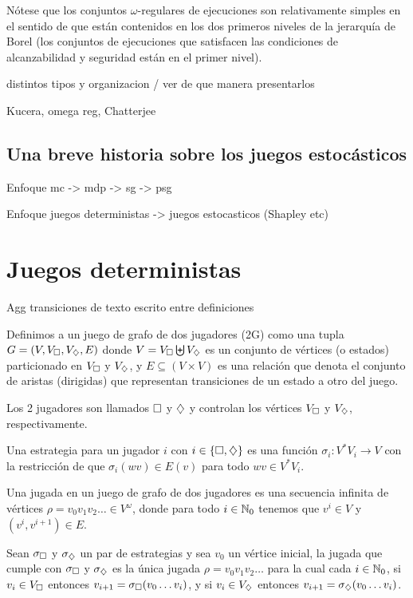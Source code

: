 Nótese que los conjuntos \(\omega\)-regulares de ejecuciones son relativamente
simples en el sentido de que están contenidos en los dos primeros niveles de la
jerarquía de Borel (los conjuntos de ejecuciones que satisfacen las condiciones
de alcanzabilidad y seguridad están en el primer nivel).

distintos tipos y organizacion / ver de que manera presentarlos

Kucera, omega reg, Chatterjee

\subsection{Una breve historia sobre los juegos estocásticos}

Enfoque mc -> mdp -> sg -> psg

Enfoque juegos deterministas -> juegos estocasticos (Shapley etc)

\section{Juegos deterministas}

Agg transiciones de texto escrito entre definiciones

\begin{definition}
	Definimos a un juego de grafo de dos jugadores (2G) como una tupla $G = (V, V_\square,V_\diamondsuit, E)$ donde $V = V_\square \biguplus V_\diamondsuit$ es un conjunto de vértices (o estados) particionado en $V_\square$ y $V_\diamondsuit$, y $E \subseteq (V\times V)$ es una relación que denota el conjunto de aristas (dirigidas) que representan transiciones de un estado a otro del juego.

	Los 2 jugadores son llamados $\square$ y $\diamondsuit$ y controlan los vértices
	$V_\square$ y $V_\diamondsuit$, respectivamente.
\end{definition}

\begin{definition}
	Una estrategia para un jugador $i$ con $i \in \{\square, \diamondsuit\}$ es una función $\sigma_i: V^*V_i \rightarrow V$ con la restricción de que $\sigma_i(wv) \in E(v)$ para todo $wv \in V^*V_i$.
\end{definition}

\begin{definition}
	Una jugada en un juego de grafo de dos jugadores es una secuencia infinita de vértices $\rho = v_0v_1v_2 \dots \in V^\omega$, donde para todo $i \in \mathbb{N}_0$ tenemos que $v^i \in V$ y $(v^i, v^{i+1}) \in E$.

	Sean $\sigma_\square$ y $\sigma_\diamondsuit$ un par de estrategias y sea $v_0$ un
	vértice inicial, la jugada que cumple con $\sigma_\square$ y $\sigma_\diamondsuit$ es la
	única jugada $\rho = v_0 v_1 v_2 \dots$ para la cual cada $i \in \mathbb{N}_0$, si $v_i
		\in V_\square$ entonces $v_{i+1} = \sigma_\square(v_0 \dots v_i)$, y si $v_i \in
		V_\diamondsuit$ entonces $v_{i+1} = \sigma_\diamondsuit(v_0 \dots v_i)$.
\end{definition}

